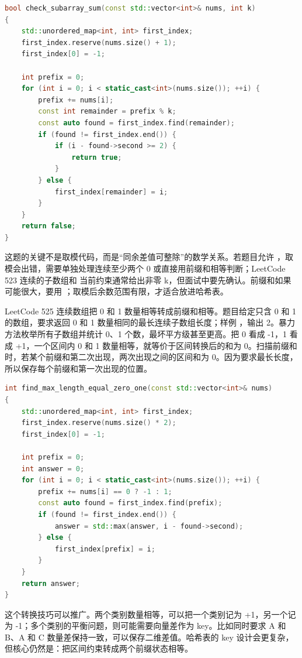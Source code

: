 \begin{lstlisting}[language=C++,caption={LeetCode 523 连续的子数组和：余数最早位置}]
bool check_subarray_sum(const std::vector<int>& nums, int k)
{
    std::unordered_map<int, int> first_index;
    first_index.reserve(nums.size() + 1);
    first_index[0] = -1;

    int prefix = 0;
    for (int i = 0; i < static_cast<int>(nums.size()); ++i) {
        prefix += nums[i];
        const int remainder = prefix % k;
        const auto found = first_index.find(remainder);
        if (found != first_index.end()) {
            if (i - found->second >= 2) {
                return true;
            }
        } else {
            first_index[remainder] = i;
        }
    }
    return false;
}
\end{lstlisting}

这题的关键不是取模代码，而是“同余差值可整除”的数学关系。若题目允许 ，取模会出错，需要单独处理连续至少两个 0 或直接用前缀和相等判断；LeetCode 523 连续的子数组和 当前约束通常给出非零 k，但面试中要先确认。前缀和如果可能很大，要用 ；取模后余数范围有限，才适合放进哈希表。

LeetCode 525 连续数组把 0 和 1 数量相等转成前缀和相等。题目给定只含 0 和 1 的数组，要求返回 0 和 1 数量相同的最长连续子数组长度；样例 ，输出 2。暴力方法枚举所有子数组并统计 0、1 个数，最坏平方级甚至更高。把 0 看成 -1，1 看成 +1，一个区间内 0 和 1 数量相等，就等价于区间转换后的和为 0。扫描前缀和时，若某个前缀和第二次出现，两次出现之间的区间和为 0。因为要求最长长度，所以保存每个前缀和第一次出现的位置。

\begin{lstlisting}[language=C++,caption={LeetCode 525 连续数组：0 转成 -1 后找相同前缀和}]
int find_max_length_equal_zero_one(const std::vector<int>& nums)
{
    std::unordered_map<int, int> first_index;
    first_index.reserve(nums.size() * 2);
    first_index[0] = -1;

    int prefix = 0;
    int answer = 0;
    for (int i = 0; i < static_cast<int>(nums.size()); ++i) {
        prefix += nums[i] == 0 ? -1 : 1;
        const auto found = first_index.find(prefix);
        if (found != first_index.end()) {
            answer = std::max(answer, i - found->second);
        } else {
            first_index[prefix] = i;
        }
    }
    return answer;
}
\end{lstlisting}

这个转换技巧可以推广。两个类别数量相等，可以把一个类别记为 +1，另一个记为 -1；多个类别的平衡问题，则可能需要向量差作为 key。比如同时要求 A 和 B、A 和 C 数量差保持一致，可以保存二维差值。哈希表的 key 设计会更复杂，但核心仍然是：把区间约束转成两个前缀状态相等。

